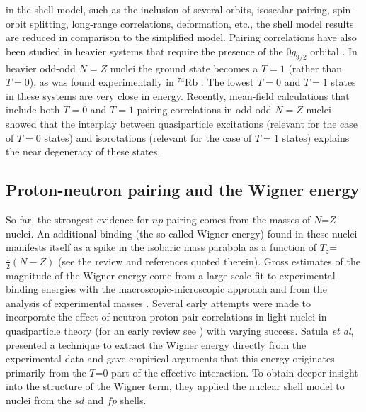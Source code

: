 \documentclass[rmp,aps,floatfix]{revtex4}
\begin{document}
in the shell model, such as the inclusion of several orbits, isoscalar 
pairing, spin-orbit splitting, long-range correlations, deformation, 
etc., the shell model results are reduced in comparison to the simplified
model. 
Pairing correlations have also
been studied in heavier systems that require the
presence of the $0g_{9/2}$ orbital \cite{dean97,petrovici00}. 
In heavier odd-odd $N=Z$ nuclei the ground state becomes a $T=1$
(rather than $T=0$), as was found experimentally in $^{74}$Rb 
\cite{rudolph96}. The lowest $T=0$ and $T=1$ states in these systems
are very close in energy.
Recently, mean-field calculations that include both
$T=0$ and $T=1$ pairing correlations in odd-odd $N=Z$ nuclei 
\cite{satula01} showed that the interplay between quasiparticle 
excitations (relevant for the case of $T = 0$ states) and 
isorotations (relevant for the case of $T = 1$ states)
explains the near degeneracy of these states.



\subsection{Proton-neutron pairing and the Wigner energy}
\label{subsec:wigner}

So far, the strongest evidence for $np$ pairing comes from the
masses  of $N$=$Z$ nuclei. An additional binding (the so-called
Wigner energy) found in these nuclei  manifests itself as a
spike in the isobaric mass parabola as a function of
$T_z$=$\frac{1}{2}(N-Z)$ (see
the review \cite{Zel96} and references quoted therein).  
Gross estimates of the  magnitude of the Wigner energy
come from a large-scale fit to experimental binding energies
with the macroscopic-microscopic
approach \cite{Mye66,Kra79} and  from the analysis
of experimental masses \cite{Jen84}.
Several early attempts were made to incorporate the
effect of neutron-proton pair correlations in light 
nuclei in quasiparticle theory (for an early review see
\cite{goodman79}) with varying success. 
Satula {\em et al}, \cite{Sat97} presented  a
technique to extract the Wigner energy directly from the
experimental data and  gave empirical arguments that this
energy originates primarily from the $T$=0  part of the
effective interaction. To obtain deeper insight into the
structure of the Wigner term, they applied the
nuclear shell model to nuclei from the $sd$ and $fp$ shells.
\end{document}
